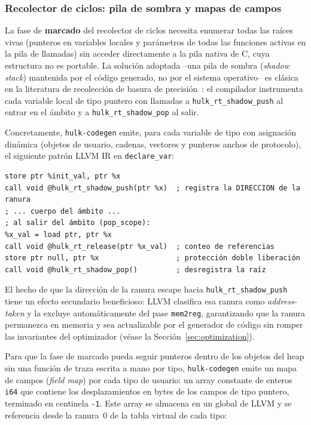 \documentclass[12pt, a4paper]{article}
\begin{document}
\subsubsection{Recolector de ciclos: pila de sombra y mapas de campos}
\label{sec:gc-full}

La fase de \textbf{marcado} del recolector de ciclos necesita enumerar todas
las raíces vivas (punteros en variables locales y parámetros de todas las
funciones activas en la pila de llamadas) sin acceder directamente a la pila
nativa de C, cuya estructura no es portable. La solución adoptada --una
pila de sombra (\textit{shadow stack}) mantenida por el código generado, no por el sistema
operativo-- es clásica en la literatura de recolección de basura de
precisión~\cite{jones2011}: el compilador instrumenta cada variable local de
tipo puntero con llamadas a \texttt{hulk\_rt\_shadow\_push} al entrar en el
ámbito y a \texttt{hulk\_rt\_shadow\_pop} al salir.

Concretamente, \texttt{hulk-codegen} emite, para cada variable de tipo con
asignación dinámica (objetos de usuario, cadenas, vectores y punteros anchos de
protocolo), el siguiente patrón LLVM IR en \texttt{declare\_var}:

\begin{lstlisting}[language={},caption={Patrón LLVM IR para una variable de tipo puntero con shadow stack},
                   label=lst:shadow-push-ir]
%x = alloca ptr                          ; la ranura queda en memoria
store ptr %init_val, ptr %x
call void @hulk_rt_shadow_push(ptr %x)  ; registra la DIRECCION de la ranura
; ... cuerpo del ámbito ...
; al salir del ámbito (pop_scope):
%x_val = load ptr, ptr %x
call void @hulk_rt_release(ptr %x_val)  ; conteo de referencias
store ptr null, ptr %x                  ; protección doble liberación
call void @hulk_rt_shadow_pop()         ; desregistra la raíz
\end{lstlisting}

El hecho de que la dirección de la ranura escape hacia
\texttt{hulk\_rt\_shadow\_push} tiene un efecto secundario beneficioso: LLVM
clasifica esa ranura como \textit{address-taken} y la excluye automáticamente
del pase \texttt{mem2reg}, garantizando que la ranura permanezca en memoria y
sea actualizable por el generador de código sin romper las invariantes del
optimizador (véase la Sección~\ref{sec:optimization}).

Para que la fase de marcado pueda seguir punteros dentro de los objetos del
heap sin una función de traza escrita a mano por tipo, \texttt{hulk-codegen}
emite un mapa de campos (\textit{field map}) por cada tipo de usuario:
un array constante de enteros \texttt{i64} que contiene los desplazamientos en
bytes de los campos de tipo puntero, terminado en centinela \texttt{-1}. Este
array se almacena en un global de LLVM y se referencia desde la ranura~0
de la tabla virtual de cada tipo:
\end{document}
